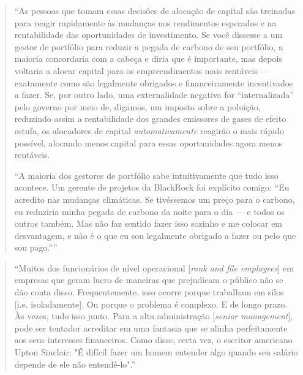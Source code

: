 \documentclass[12pt]{article}
\begin{document}
\begin{quote}
    ``As pessoas que tomam essas decisões de alocação de capital são treinadas para reagir rapidamente às mudanças nos rendimentos esperados e na rentabilidade das oportunidades de investimento. Se você dissesse a um gestor de portfólio para reduzir a pegada de carbono de seu portfólio, a maioria concordaria com a cabeça e diria que é importante, mas depois voltaria a alocar capital para os empreendimentos mais rentáveis --- exatamente como são legalmente obrigados e financeiramente incentivados a fazer. Se, por outro lado, uma externalidade negativa for ``internalizada'' pelo governo por meio de, digamos, um imposto sobre a poluição, reduzindo assim a rentabilidade dos grandes emissores de gases de efeito estufa, os alocadores de capital \textit{automaticamente} reagirão o mais rápido possível, alocando menos capital para essas oportunidades agora menos rentáveis.

    ``A maioria dos gestores de portfólio sabe intuitivamente que tudo isso acontece. Um gerente de projetos da BlackRock foi explícito comigo: “Eu acredito nas mudanças climáticas. Se tivéssemos um preço para o carbono, eu reduziria minha pegada de carbono da noite para o dia --- e todos os outros também. Mas não faz sentido fazer isso sozinho e me colocar em desvantagem, e não é o que eu sou legalmente obrigado a fazer ou pelo que sou pago.”'' \cite[p. 24]{Fancy2021}
\end{quote}


\begin{quote}
    ``Muitos dos funcionários de nível operacional [\textit{rank and file employees}] em empresas que geram lucro de maneiras que prejudicam o público não se dão conta disso. Frequentemente, isso ocorre porque trabalham em silos [i.e. isoladamente]. Ou porque o problema é complexo. E de longo prazo. Às vezes, tudo isso junto. Para a alta administração [\textit{senior management}], pode ser tentador acreditar em uma fantasia que se alinha perfeitamente aos seus interesses financeiros. Como disse, certa vez, o escritor americano Upton Sinclair: "É difícil fazer um homem entender algo quando seu salário depende de ele não entendê-lo".'' \cite[p. 26]{Fancy2021}
\end{quote}
\end{document}
